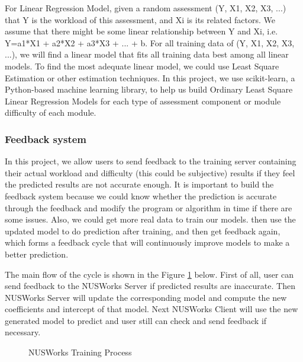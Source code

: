 \documentclass[fyp]{socreport}
\begin{document}
For Linear Regression Model, given a random assessment (Y, X1, X2, X3, ...) that Y is the workload of this assessment, and Xi is its related factors. We assume that there might be some linear relationship between Y and Xi, i.e. Y=a1*X1 + a2*X2 + a3*X3 + ... + b. For all training data of (Y, X1, X2, X3, ...), we will find a linear model that fits all training data best among all linear models. To find the most adequate linear model, we could use Least Square Estimation or other estimation techniques. In this project, we use scikit-learn, a Python-based machine learning library, to help us build Ordinary Least Square Linear Regression Models for each type of assessment component or module difficulty of each module.

\subsubsection{Feedback system}
In this project, we allow users to send feedback to the training server containing their actual workload and difficulty (this could be subjective) results if they feel the predicted results are not accurate enough. It is important to build the feedback system because we could know whether the prediction is accurate through the feedback and modify the program or algorithm in time if there are some issues. Also, we could get more real data to train our models. then use the updated model to do prediction after training, and then get feedback again, which forms a feedback cycle that will continuously improve models to make a better prediction.

The main flow of the cycle is shown in the Figure {\ref{training-process}} below. First of all, user can send feedback to the NUSWorks Server if predicted results are inaccurate. Then NUSWorks Server will update the corresponding model and compute the new coefficients and intercept of that model. Next NUSWorks Client will use the new generated model to predict and user still can check and send feedback if necessary.

\begin{figure}
\caption{NUSWorks Training Process}
\label{training-process}
\end{figure}
\end{document}
